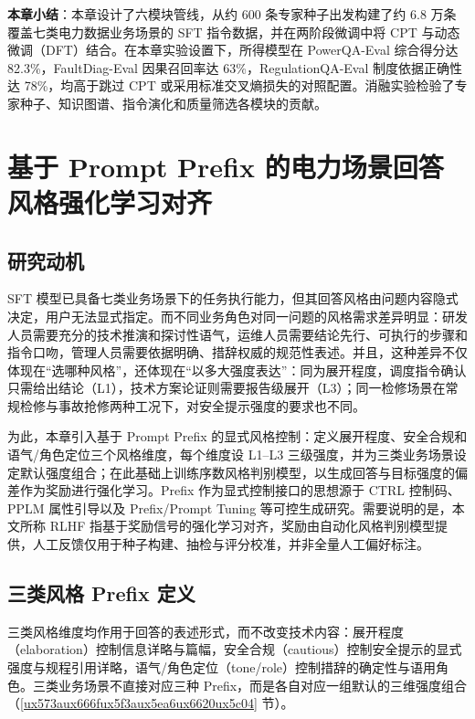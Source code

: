 \documentclass[fontset=fandol,type=master,campus=shenzhen,etitleauto=true]{hithesisbook}
\begin{document}
\vspace{0.5cm}
\noindent \textbf{本章小结}：本章设计了六模块管线，从约 600 条专家种子出发构建了约 6.8 万条覆盖七类电力数据业务场景的 SFT 指令数据，并在两阶段微调中将 CPT 与动态微调（DFT）结合。在本章实验设置下，所得模型在 PowerQA-Eval 综合得分达 82.3\%，FaultDiag-Eval 因果召回率达 63\%，RegulationQA-Eval 制度依据正确性达 78\%，均高于跳过 CPT 或采用标准交叉熵损失的对照配置。消融实验检验了专家种子、知识图谱、指令演化和质量筛选各模块的贡献。

\chapter{基于 Prompt Prefix 的电力场景回答风格强化学习对齐}\label{ux57faux4e8e-prompt-prefix-ux7684ux7535ux529bux573aux666fux56deux7b54ux98ceux683cux5f3aux5316ux5b66ux4e60ux5bf9ux9f50}

\section{研究动机}\label{ux7814ux7a76ux52a8ux673a-1}

SFT 模型已具备七类业务场景下的任务执行能力，但其回答风格由问题内容隐式决定，用户无法显式指定。而不同业务角色对同一问题的风格需求差异明显：研发人员需要充分的技术推演和探讨性语气，运维人员需要结论先行、可执行的步骤和指令口吻，管理人员需要依据明确、措辞权威的规范性表述。并且，这种差异不仅体现在“选哪种风格”，还体现在“以多大强度表达”：同为展开程度，调度指令确认只需给出结论（L1），技术方案论证则需要报告级展开（L3）；同一检修场景在常规检修与事故抢修两种工况下，对安全提示强度的要求也不同。

为此，本章引入基于 Prompt Prefix 的显式风格控制：定义展开程度、安全合规和语气/角色定位三个风格维度，每个维度设 L1--L3 三级强度，并为三类业务场景设定默认强度组合；在此基础上训练序数风格判别模型，以生成回答与目标强度的偏差作为奖励进行强化学习。Prefix 作为显式控制接口的思想源于 CTRL 控制码、PPLM 属性引导以及 Prefix/Prompt Tuning 等可控生成研究\cite{ref36,ref37,ref38,ref39}。需要说明的是，本文所称 RLHF 指基于奖励信号的强化学习对齐，奖励由自动化风格判别模型提供，人工反馈仅用于种子构建、抽检与评分校准，并非全量人工偏好标注。

\section{三类风格 Prefix 定义}\label{ux4e09ux7c7bux98ceux683c-prefix-ux5b9aux4e49}

三类风格维度均作用于回答的表述形式，而不改变技术内容：展开程度（elaboration）控制信息详略与篇幅，安全合规（cautious）控制安全提示的显式强度与规程引用详略，语气/角色定位（tone/role）控制措辞的确定性与语用角色。三类业务场景不直接对应三种 Prefix，而是各自对应一组默认的三维强度组合（\ref{ux573aux666fux5f3aux5ea6ux6620ux5c04} 节）。
\end{document}
